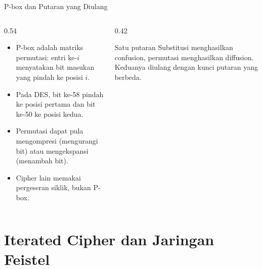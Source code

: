 \documentclass[aspectratio=169,11pt]{beamer}
\begin{document}
\begin{frame}{P-box dan Putaran yang Diulang}
    \begin{columns}[T,onlytextwidth]
        \begin{column}{0.54\textwidth}
            \footnotesize
            \begin{itemize}
                \item P-box adalah matriks permutasi: entri ke-$i$
                      menyatakan bit masukan yang pindah ke posisi $i$.
                \item Pada DES, bit ke-58 pindah ke posisi pertama dan
                      bit ke-50 ke posisi kedua.
                \item Permutasi dapat pula mengompresi (mengurangi bit)
                      atau mengekspansi (menambah bit).
                \item Cipher lain memakai pergeseran siklik, bukan P-box.
            \end{itemize}
        \end{column}
        \begin{column}{0.42\textwidth}
            \begin{block}{Satu putaran}
                \footnotesize
                Substitusi menghasilkan confusion, permutasi
                menghasilkan diffusion. Keduanya diulang dengan kunci
                putaran yang berbeda.
            \end{block}
        \end{column}
    \end{columns}
\end{frame}

\section{Iterated Cipher dan Jaringan Feistel}
\end{document}
